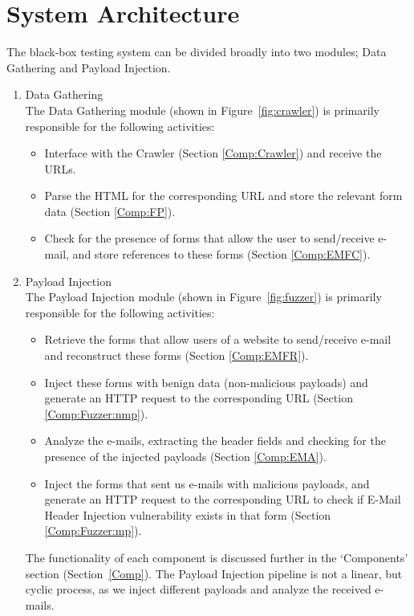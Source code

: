 \section{System Architecture}
\label{sys:arch}
The black-box testing system can be divided broadly into two modules; Data Gathering and Payload Injection.
\begin{enumerate}
	\item Data Gathering\\
	The Data Gathering module (shown in Figure~\ref{fig:crawler}) is primarily responsible for the following activities:
	\begin{itemize}
		\item Interface with the Crawler (Section \ref{Comp:Crawler}) and receive the URLs.
		\item Parse the HTML for the corresponding URL and store the relevant form data (Section \ref{Comp:FP}).
		\item Check for the presence of forms that allow the user to send/receive e-mail, and store references to these forms (Section \ref{Comp:EMFC}).
	\end{itemize} 
	\item Payload Injection\\
	The Payload Injection module (shown in Figure~\ref{fig:fuzzer}) is primarily responsible for the following activities:
	\begin{itemize}
		\item Retrieve the forms that allow users of a website to send/receive e-mail and reconstruct these forms (Section \ref{Comp:EMFR}).
		\item Inject these forms with benign data (non-malicious payloads) and generate an HTTP request to the corresponding URL (Section \ref{Comp:Fuzzer:nmp}).
		\item Analyze the e-mails, extracting the header fields and checking for the presence of the injected payloads (Section \ref{Comp:EMA}).
		\item Inject the forms that sent us e-mails with malicious payloads, and generate an HTTP request to the corresponding URL to check if E-Mail Header Injection vulnerability exists in that form (Section \ref{Comp:Fuzzer:mp}).
	\end{itemize} 
	The functionality of each component is discussed further in the `Components' section (Section~\ref{Comp}). The Payload Injection pipeline is not a linear, but cyclic process, as we inject different payloads and analyze the received e-mails.
\end{enumerate}

